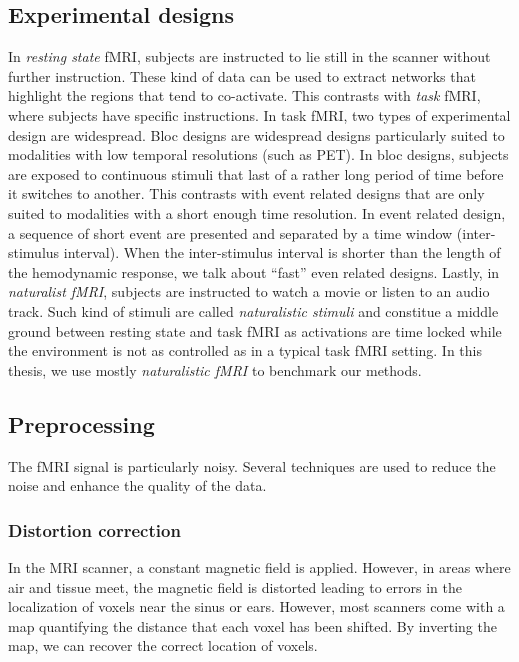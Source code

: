\subsection{Experimental designs}
In \emph{resting state} fMRI, subjects are instructed to lie still in the scanner without further instruction.
These kind of data can be used to extract networks that highlight the regions that tend to co-activate.
This contrasts with \emph{task} fMRI, where subjects have specific instructions.
In task fMRI, two types of experimental design are widespread.
Bloc designs are widespread designs particularly suited to modalities with low temporal resolutions (such as PET). In bloc designs, subjects are exposed to continuous stimuli that last of a rather long period of time before it switches to another.
This contrasts with event related designs that are only suited to modalities with a short enough time resolution. In event related design, a sequence of short event are presented and separated by a time window (inter-stimulus interval).
When the inter-stimulus interval is shorter than the length of the hemodynamic response, we talk about ``fast'' even related designs.
Lastly, in \emph{naturalist fMRI}, subjects are instructed to watch a movie
or listen to an audio track. Such kind of stimuli are called \emph{naturalistic stimuli} and constitue a middle ground between resting state and task fMRI as activations are time locked while the environment is not as controlled as in a typical task fMRI setting.
In this thesis, we use mostly \emph{naturalistic fMRI} to benchmark our methods.

\subsection{Preprocessing}
The fMRI signal is particularly noisy. Several techniques are used to reduce the noise and enhance the quality of the data.

\subsubsection{Distortion correction}
In the MRI scanner, a constant magnetic field is applied. However, in areas
where air and tissue meet, the magnetic field is distorted leading to errors in
the localization of voxels near the sinus or ears. However, most scanners come
with a map quantifying the distance that each voxel has been shifted. By
inverting the map, we can recover the correct location of voxels.


